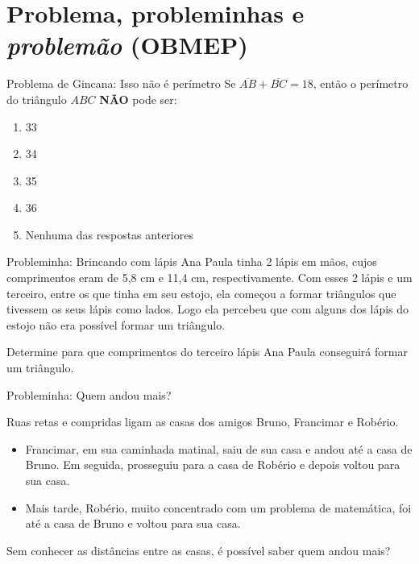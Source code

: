 \documentclass[12pt]{beamer}
\begin{document}
\section{Problema, probleminhas e \textit{problemão} (OBMEP)}

\begin{frame}{Problema de Gincana: Isso não é perímetro}
    Se $\overline{AB}+\overline{BC}=18$, então o perímetro do triângulo $ABC$ \textbf{NÃO} pode ser:

    \begin{enumerate}[a]
    	\item 33
    	\item 34 
        \item 35
        \item 36 
        \item Nenhuma das respostas anteriores
    \end{enumerate}
\end{frame}



\begin{frame}{Probleminha: Brincando com lápis}
    Ana Paula tinha 2 lápis em mãos, cujos comprimentos eram de 5,8 cm e 11,4 cm, respectivamente. Com esses 2 lápis e um terceiro, entre os que tinha em seu estojo, ela começou a formar triângulos que tivessem os seus lápis como lados. Logo ela percebeu que com alguns dos lápis do estojo não era possível formar um triângulo. 

    \vspace{2mm} 

    Determine para que comprimentos do terceiro lápis Ana Paula conseguirá formar um triângulo.
    
\end{frame}

\begin{frame}{Probleminha: Quem andou mais?}

    Ruas retas e compridas ligam as casas dos amigos Bruno, Francimar e Robério.

    \begin{itemize}
        \item Francimar, em sua caminhada matinal, saiu de sua casa e andou até a casa de Bruno. Em seguida, prosseguiu para a casa de Robério e depois voltou para sua casa.
        \item Mais tarde, Robério, muito concentrado com um problema de matemática, foi até a casa de Bruno e voltou para sua casa.
    \end{itemize} Sem conhecer as distâncias entre as casas, é possível saber quem andou mais?
\end{frame}
\end{document}
